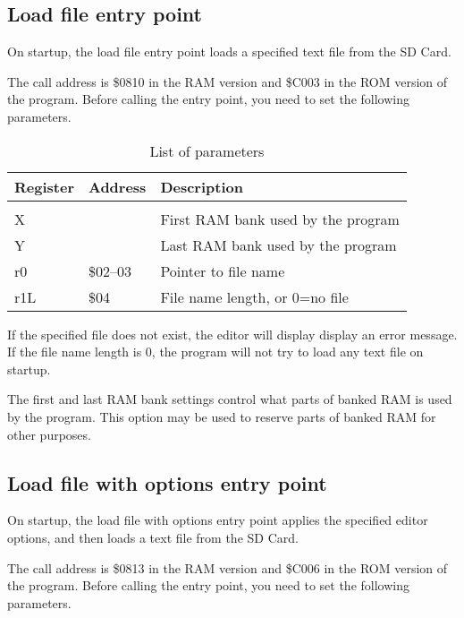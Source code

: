 \documentclass{article}
\begin{document}
    \subsection{Load file entry point}

        On startup, the load file entry point loads a specified text file from the SD Card.

        The call address is \$0810 in the RAM version and \$C003 in the ROM version of the program.
        Before calling the entry point, you need to set the following parameters.

        \begin{longtable}{l l l}
            \caption{List of parameters} \\
	        \textbf{Register} & \textbf{Address} & \textbf{Description} \\
	        \hline \\
            X   &          & First RAM bank used by the program \\
            Y   &          & Last RAM bank used by the program \\
            r0  & \$02--03 & Pointer to file name \\
            r1L & \$04     & File name length, or 0=no file \\
        \end{longtable}

        \noindent If the specified file does not exist, the editor will display display an
        error message. If the file name length is 0, the program will not try
        to load any text file on startup.

        The first and last RAM bank settings control what parts of banked RAM is
        used by the program. This option may be used to reserve parts of banked RAM
        for other purposes.

    \subsection{Load file with options entry point}

        On startup, the load file with options entry point applies the specified editor options, and then loads
        a text file from the SD Card.

        The call address is \$0813 in the RAM version and \$C006 in the ROM version of the program.
        Before calling the entry point, you need to set the following parameters.
\end{document}
